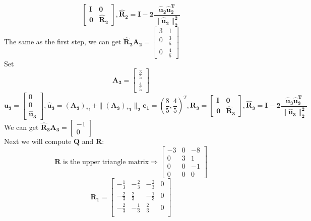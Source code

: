 \documentclass[english,onecolumn]{IEEEtran}
\begin{document}
\begin{enumerate}
$$\begin{bmatrix}
         \mathbf{I} & \mathbf{0}  \\
         \mathbf{0} & \mathbf{\hat{R}_2} 
    \end{bmatrix}, 
    \mathbf{\hat{R}_2 = I -2 \frac{\hat{u}_2 \hat{u}_2^T}{\| \hat{u}_2 \|_2^2}}
    $$
    The same as the first step, we can get $\mathbf{\hat{R}_2 A_2} = 
    \begin{bmatrix}
         3 & 1  \\
         0 & \frac{3}{5} \\
         0 & \frac{4}{5}
    \end{bmatrix}
    $\\
    Set $$ \mathbf{A_3} = \begin{bmatrix}  \frac{3}{5} \\ \frac{4}{5}  \end{bmatrix} $$
    $$\mathbf{u_3} = \begin{bmatrix}  0 \\ 0 \\ \mathbf{\hat{u}_3}  \end{bmatrix}, 
    \mathbf{\hat{u}_3} = \mathbf{(A_3)_{* 1} + \| (A_3)_{* 1}  \|_2 e_1 }  = (\frac{8}{5},\frac{4}{5})^T,
    \mathbf{R_3} = \begin{bmatrix}
         \mathbf{I} & \mathbf{0}  \\
         \mathbf{0} & \mathbf{\hat{R}_3} 
    \end{bmatrix}, 
    \mathbf{\hat{R}_3 = I -2 \frac{\hat{u}_3 \hat{u}_3^T}{\| \hat{u}_3 \|_2^2}}
    $$
    We can get $\mathbf{\hat{R}_3 A_3} = \begin{bmatrix}  -1 \\ 0  \end{bmatrix}$\\
    Next we will compute $\mathbf{Q}$ and $\mathbf{R}$:\\
    $$ 
    \mathbf{R} \text{ is the upper triangle matrix} \Rightarrow 
    \begin{bmatrix}
        -3 & 0 & -8  \\
        0 & 3 & 1 \\
        0 & 0 & -1 \\
        0 & 0 & 0
    \end{bmatrix}
    $$
    $$
    \mathbf{R_1} = \begin{bmatrix}
        -\frac{1}{3} & -\frac{2}{3} & -\frac{2}{3} & 0 \\
        -\frac{2}{3} & \frac{2}{3} & -\frac{1}{3} & 0 \\
        -\frac{2}{3} & -\frac{1}{3} & \frac{2}{3} & 0 \\

\end{bmatrix}$$
\end{enumerate}
\end{document}
